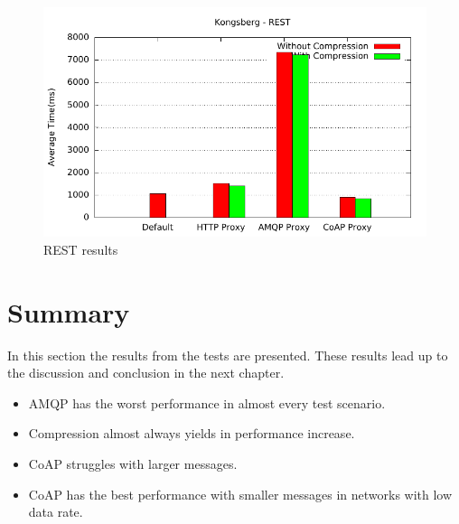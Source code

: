 \begin{figure}[H]
\center
\includegraphics[scale=0.75]{../results/kongsberg/rest/out.pdf}
\caption{REST results}
\end{figure}



\section{Summary}

In this section the results from the tests are presented. These results lead up
to the discussion and conclusion in the next chapter.

\begin{itemize}
\item AMQP has the worst performance in almost every test scenario.
\item Compression almost always yields in performance increase.
\item CoAP struggles with larger messages.
\item CoAP has the best performance with smaller messages in networks with low data rate.
\end{itemize}
